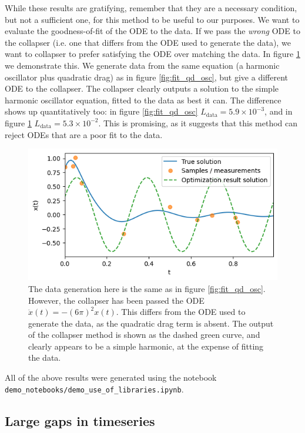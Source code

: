 \documentclass{article}
\begin{document}
While these results are gratifying, remember that they are a necessary condition, but not a sufficient one, for this method to be useful to our purposes.
We want to evaluate the goodness-of-fit of the ODE to the data.
If we pass the \emph{wrong} ODE to the collapser (i.e. one that differs from the ODE used to generate the data), we want to collapser to prefer satisfying the ODE over matching the data.
In figure \ref{fig:badfit_qd_osc_sho} we demonstrate this.
We generate data from the same equation (a harmonic oscillator plus quadratic drag) as in figure \ref{fig:fit_qd_osc}, but give a different ODE to the collapser.
The collapser clearly outputs a solution to the simple harmonic oscillator equation, fitted to the data as best it can.
The difference shows up quantitatively too: in figure \ref{fig:fit_qd_osc} $L_{\mathrm{data}} = 5.9 \times 10^{-3}$, and in figure \ref{fig:badfit_qd_osc_sho} $L_{\mathrm{data}} = 5.3 \times 10^{-2}$.
This is promising, as it suggests that this method can reject ODEs that are a poor fit to the data.

\begin{figure}
\includegraphics{images/results/badfit_qd_osc_sho.png}
\centering
\caption{
The data generation here is the same as in figure \ref{fig:fit_qd_osc}.
However, the collapser has been passed the ODE $\ddot{x}(t) = - (6\pi)^2 x(t)$.
This differs from the ODE used to generate the data, as the quadratic drag term is absent.
The output of the collapser method is shown as the dashed green curve, and clearly appears to be a simple harmonic, at the expense of fitting the data.
}
\label{fig:badfit_qd_osc_sho}
\end{figure}

All of the above results were generated using the notebook \texttt{demo\_notebooks/demo\_use\_of\_libraries.ipynb}.

\subsection{Large gaps in timeseries}
\end{document}
